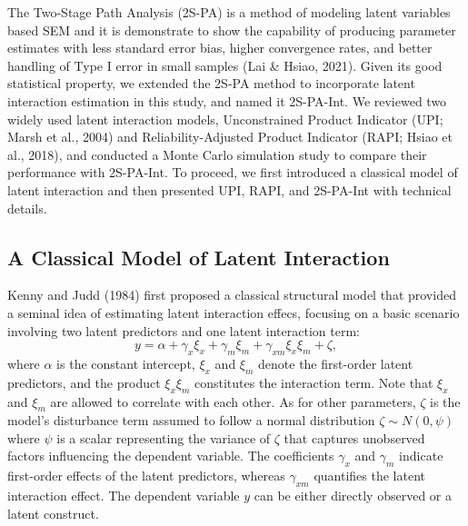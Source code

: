 \documentclass[
  man]{apa6}
\begin{document}
The Two-Stage Path Analysis (2S-PA) is a method of modeling latent variables based SEM and it is demonstrate to show the capability of producing parameter estimates with less standard error bias, higher convergence rates, and better handling of Type I error in small samples (Lai \& Hsiao, 2021). Given its good statistical property, we extended the 2S-PA method to incorporate latent interaction estimation in this study, and named it 2S-PA-Int. We reviewed two widely used latent interaction models, Unconstrained Product Indicator (UPI; Marsh et al., 2004) and Reliability-Adjusted Product Indicator (RAPI; Hsiao et al., 2018), and conducted a Monte Carlo simulation study to compare their performance with 2S-PA-Int. To proceed, we first introduced a classical model of latent interaction and then presented UPI, RAPI, and 2S-PA-Int with technical details.

\hypertarget{a-classical-model-of-latent-interaction}{%
\subsection{A Classical Model of Latent Interaction}\label{a-classical-model-of-latent-interaction}}

Kenny and Judd (1984) first proposed a classical structural model that provided a seminal idea of estimating latent interaction effecs, focusing on a basic scenario involving two latent predictors and one latent interaction term:
\begin{equation}
y = \alpha + \gamma_{x}\xi_{x} + \gamma_{m}\xi_{m} + \gamma_{xm}\xi_{x}\xi_{m} + \zeta,
\end{equation}
where \(\alpha\) is the constant intercept, \(\xi_{x}\) and \(\xi_{m}\) denote the first-order latent predictors, and the product \(\xi_{x}\xi_{m}\) constitutes the interaction term. Note that \(\xi_{x}\) and \(\xi_{m}\) are allowed to correlate with each other. As for other parameters, \(\zeta\) is the model's disturbance term assumed to follow a normal distribution \(\zeta \sim N(0, \psi)\) where \(\psi\) is a scalar representing the variance of \(\zeta\) that captures unobserved factors influencing the dependent variable. The coefficients \(\gamma_{x}\) and \(\gamma_{m}\) indicate first-order effects of the latent predictors, whereas \(\gamma_{xm}\) quantifies the latent interaction effect. The dependent variable \(y\) can be either directly observed or a latent construct.
\end{document}
